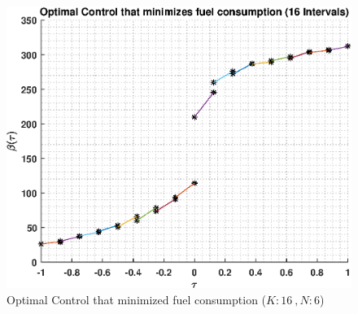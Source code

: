 \documentclass[]{article}
\begin{document}
\begin{figure}
	\centering
	\includegraphics[scale=0.75]{directControlK16Poly6.eps}
	\caption{Optimal Control that minimized fuel consumption (\(K:16\ , N:6\))}
	\label{fig:directControlK16Poly6}
\end{figure}
\end{document}
